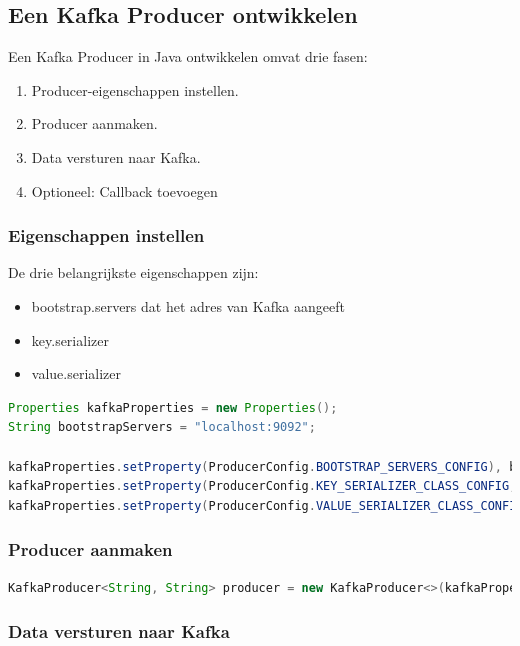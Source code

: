 \documentclass[a4paper,10pt,twoside]{report}
\begin{document}
\subsection{Een Kafka Producer ontwikkelen}

Een Kafka Producer in Java ontwikkelen omvat drie fasen:

\begin{enumerate}
	\item Producer-eigenschappen instellen.
	\item Producer aanmaken.
	\item Data versturen naar Kafka.
	\item Optioneel: Callback toevoegen
\end{enumerate}

\subsubsection{Eigenschappen instellen}

De drie belangrijkste eigenschappen zijn: 

\begin{itemize}
	\item bootstrap.servers dat het adres van Kafka aangeeft
	\item key.serializer
	\item value.serializer
\end{itemize}

\begin{lstlisting}[language=Java]
Properties kafkaProperties = new Properties();
String bootstrapServers = "localhost:9092";

kafkaProperties.setProperty(ProducerConfig.BOOTSTRAP_SERVERS_CONFIG), bootstrapServers);
kafkaProperties.setProperty(ProducerConfig.KEY_SERIALIZER_CLASS_CONFIG, bootstrapServers);
kafkaProperties.setProperty(ProducerConfig.VALUE_SERIALIZER_CLASS_CONFIG, StringSerializer.class.getName());
\end{lstlisting}

\subsubsection{Producer aanmaken}

\begin{lstlisting}[language=Java]
KafkaProducer<String, String> producer = new KafkaProducer<>(kafkaProperties);
\end{lstlisting}

\subsubsection{Data versturen naar Kafka}
\end{document}
